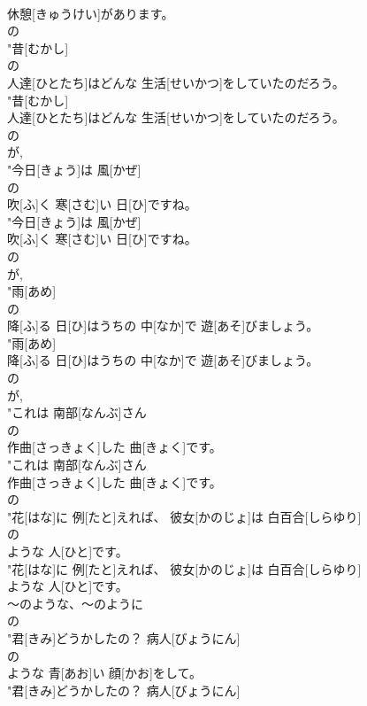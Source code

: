 \documentclass[8pt]{extreport}
\begin{document}
\begin{CJK}{UTF8}{min}
\\	休憩[きゅうけい]があります。
\\	の
\\	"昔[むかし]
\\	の
\\	人達[ひとたち]はどんな 生活[せいかつ]をしていたのだろう。
\\	"昔[むかし]
\\	人達[ひとたち]はどんな 生活[せいかつ]をしていたのだろう。
\\	の
\\	が, 
\\	"今日[きょう]は 風[かぜ]
\\	の
\\	吹[ふ]く 寒[さむ]い 日[ひ]ですね。
\\	"今日[きょう]は 風[かぜ]
\\	吹[ふ]く 寒[さむ]い 日[ひ]ですね。
\\	の
\\	が, 
\\	"雨[あめ]
\\	の
\\	降[ふ]る 日[ひ]はうちの 中[なか]で 遊[あそ]びましょう。
\\	"雨[あめ]
\\	降[ふ]る 日[ひ]はうちの 中[なか]で 遊[あそ]びましょう。
\\	の
\\	が, 
\\	"これは 南部[なんぶ]さん
\\	の
\\	作曲[さっきょく]した 曲[きょく]です。
\\	"これは 南部[なんぶ]さん
\\	作曲[さっきょく]した 曲[きょく]です。
\\	の
\\	"花[はな]に 例[たと]えれば、 彼女[かのじょ]は 白百合[しらゆり]
\\	の
\\	ような 人[ひと]です。
\\	"花[はな]に 例[たと]えれば、 彼女[かのじょ]は 白百合[しらゆり]
\\	ような 人[ひと]です。
\\	～のような、～のように	
\\	の
\\	"君[きみ]どうかしたの？ 病人[びょうにん]
\\	の
\\	ような 青[あお]い 顔[かお]をして。
\\	"君[きみ]どうかしたの？ 病人[びょうにん]

\end{CJK}
\end{document}
